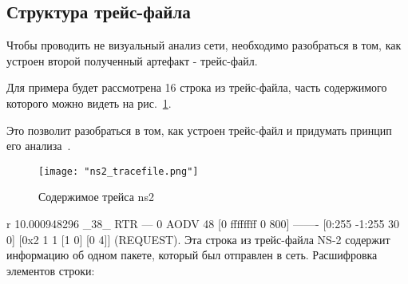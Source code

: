\subsection*{Структура трейс-файла}

Чтобы проводить не визуальный анализ сети, необходимо разобраться в том, как устроен второй полученный артефакт - трейс-файл.

Для примера будет рассмотрена 16 строка из трейс-файла, часть содержимого которого можно видеть на рис.~\ref{fig:ns2_tracefile}.

Это позволит разобраться в том, как устроен трейс-файл и придумать принцип его анализа~\cite{salleh2006trace}.

\begin{figure}[!h]
  \centering
  \texttt{[image: "ns2\_tracefile.png"]}
  \caption{Содержимое трейса ns2}
  \label{fig:ns2_tracefile}
\end{figure}

r 10.000948296 \_38\_ RTR  --- 0 AODV 48 [0 ffffffff 0 800] ------- [0:255 -1:255 30 0] [0x2 1 1 [1 0] [0 4]] (REQUEST). Эта строка из трейс-файла NS-2 содержит информацию об одном пакете, который был отправлен в сеть. 
Расшифровка элементов строки:

